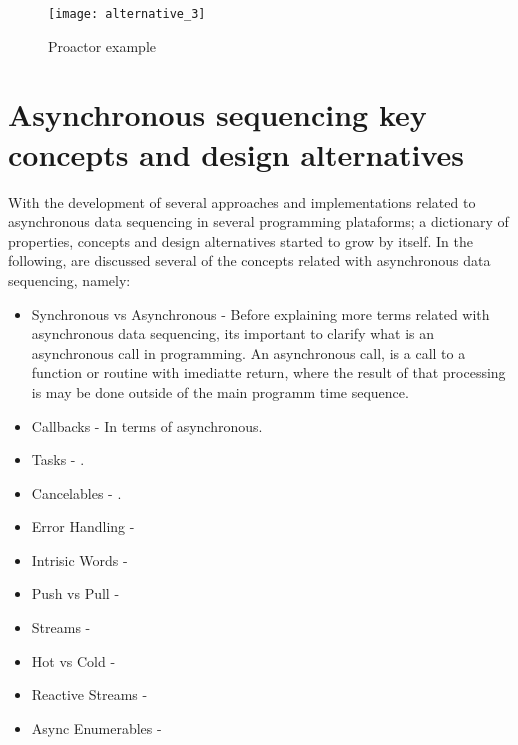 \begin{figure}[ht]
	\centering
	\texttt{[image: alternative\_3]}
	  \caption{Proactor example}
  \label{fig:bibtex}
\end{figure}


\section{Asynchronous sequencing key concepts and design alternatives} %
\label{sec:async_concepts}

With the development of several approaches and implementations related to asynchronous data sequencing in several programming plataforms; a dictionary
of properties, concepts and design alternatives started to grow by itself. In the following, are discussed several of the concepts related with asynchronous data sequencing, namely:


\begin{itemize}
	\item Synchronous vs Asynchronous - Before explaining more terms related with asynchronous data sequencing, its important to clarify what is an asynchronous call in programming. An asynchronous call, is a call to a function or routine with imediatte return, where the result of that processing is may be done outside of the main programm time sequence.  
	
	\item Callbacks - In terms of asynchronous.\\
	\item Tasks - . \\
	\item Cancelables - . \\
	\item Error Handling - \\
	\item Intrisic Words - \\
	\item Push vs Pull - \\
	\item Streams -  \\
	\item Hot vs Cold -\\
	\item Reactive Streams - \\
	\item Async Enumerables - \\ 

    
\end{itemize}

